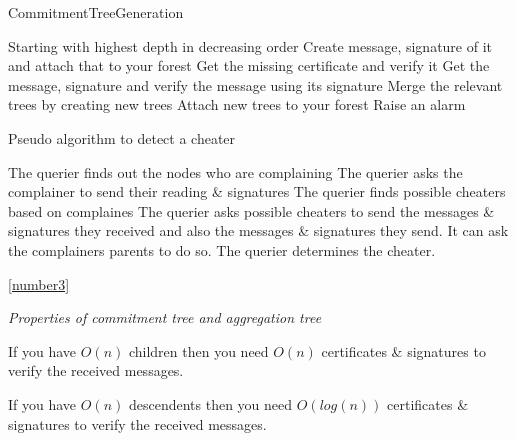 \begin{algorithm}[H]\label{number3} \caption {CommitmentTreeGeneration}
	\begin {algorithmic}[1]
		\STATE Starting with highest depth in decreasing order 
				\STATE Create message, signature of it and attach that to your forest
									\STATE Get the missing certificate and verify it
								\ELSE
									\STATE Get the message, signature and verify the message using its signature 
										\STATE Merge the relevant trees by creating new trees
										\STATE Attach new trees to your forest
									\ELSE
										\STATE Raise an alarm
									\ENDIF
								\ENDIF
							\ENDFOR
						\ENDFOR
					\ENDIF
			\ENDFOR
	\end{algorithmic}
\end{algorithm}

\begin{algorithm}
\caption{Pseudo algorithm to detect a cheater}
	\begin{algorithmic}[1]
			\STATE The querier finds out the nodes who are complaining 
			\STATE The querier asks the complainer to send their reading \& signatures
			\STATE The querier finds possible cheaters based on complaines
			\STATE The querier asks possible cheaters to send the messages \& signatures they received and also the messages \& signatures they send. It can ask the complainers parents to do so.
			\STATE The querier determines the cheater. 
	\end{algorithmic}
\end{algorithm}

\ref{number3}

\textit{Properties of commitment tree and aggregation tree}

	If you have $O(n)$ children then you need $O(n)$ certificates \& signatures to verify the received messages.

	If you have $O(n)$ descendents then you need $O(log(n))$ certificates \& signatures to verify the received messages.
